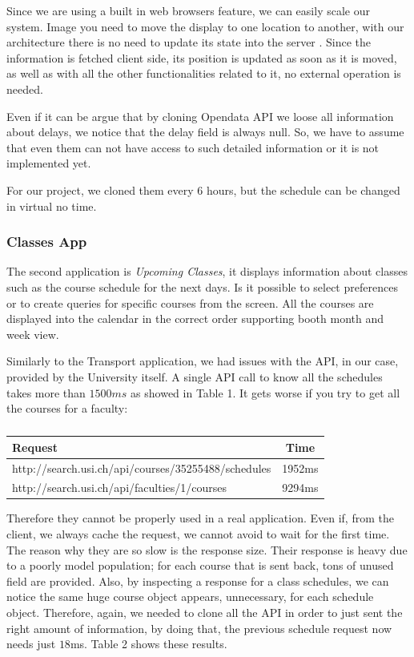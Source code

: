 \documentclass[]{usiinfbachelorproject}
\begin{document}
Since we are using a built in web browsers feature, we can easily scale our system. Image you need to move the display to one location to another, with our architecture there is no need to update its state into the server . Since the information is fetched client side, its position is updated as soon as it is moved, as well as with all the other functionalities related to it,  no external operation is needed.

Even if it can be argue that by cloning Opendata API we loose all information about delays, we notice that the delay field is always null. So, we have to assume that even them can not have access to such detailed information or it is not implemented yet.

For our project, we cloned them every 6 hours, but the schedule can be changed in virtual no time.

\subsubsection{Classes App}
The second application is \emph{Upcoming Classes}, it displays information about classes such as the course schedule for the next days. Is it possible to select preferences or to create queries for specific courses from the screen. All the courses are displayed into the calendar in the correct order supporting booth month and week view.

Similarly to the Transport application, we had issues with the API, in our case, provided by the University itself.
A single API call to know all the schedules takes more than $1500ms$ as showed in Table 1. It gets worse if you try to get all the courses for a faculty:
\begin{table}[h]
\centering
\begin{tabular}{|l|c|}
\hline
Request & Time \\\hline
http://search.usi.ch/api/courses/35255488/schedules & 1952ms \\
http://search.usi.ch/api/faculties/1/courses & 9294ms\\\hline
\end{tabular}
\caption{}
\label{table:usi_request}
\end{table}

Therefore they cannot be properly used in a real application. Even if, from the client, we always cache the request, we cannot avoid to wait for the first time. The reason why they are so slow is the response size. Their response is heavy due to a poorly model population; for each course that is sent back, tons of unused field are provided. Also, by inspecting a response for a class schedules, we can notice the same huge course object appears, unnecessary, for each schedule object.
Therefore, again, we needed to clone all the API in order to just sent the right amount of information, by doing that, the previous schedule request now needs just $18$ms. Table 2 shows these results.
\end{document}
